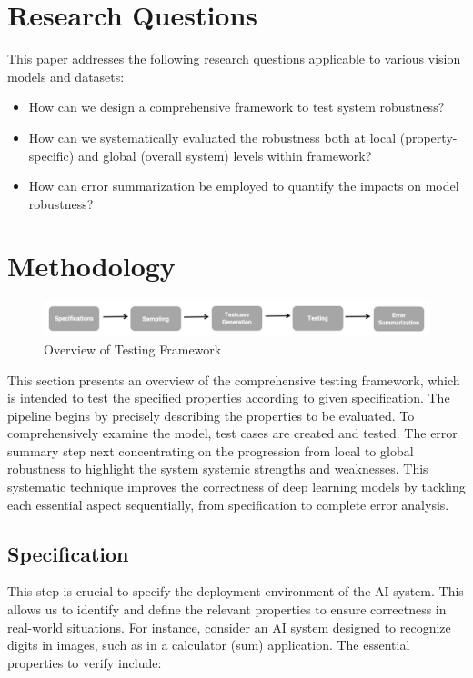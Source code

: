 \documentclass[10pt, conference, a4paper, final]{IEEEtran}
\begin{document}
\section{Research Questions}

This paper addresses the following research questions applicable to various vision models and datasets:

\begin{itemize}
    \item How can we design a comprehensive framework to test system robustness?
    \item How can we systematically evaluated the robustness both at local (property-specific) and global (overall system) levels within framework?
    \item How can error summarization be employed to quantify the impacts on model robustness?
 
\end{itemize}


\section{Methodology}
\begin{figure}{}
    \centering
    \includegraphics[width=\linewidth]{paper_images/frame.pdf}
    \caption{Overview of Testing Framework}
    \label{fig:graph}
\end{figure}


This section presents an overview of the comprehensive testing framework, which is intended to test the specified properties according to given specification. The pipeline begins by precisely describing the properties to be evaluated. To comprehensively examine the model, test cases are created and tested. The error summary step next concentrating on the progression from local to global robustness to highlight the system systemic strengths and weaknesses. This systematic technique improves the correctness of deep learning models by tackling each essential aspect sequentially, from specification to complete error analysis.
\subsection{Specification}

This step is crucial to specify the deployment environment of the AI system. This allows us to identify and define the relevant properties to ensure correctness in real-world situations. For instance, consider an AI system designed to recognize digits in images, such as in a calculator (sum)  application. The essential properties to verify include:
\end{document}
